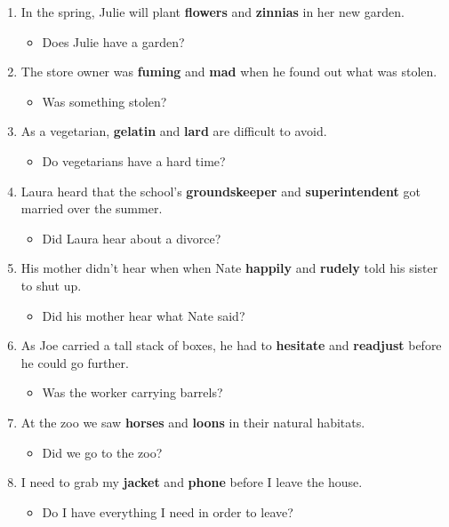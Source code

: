 \documentclass[authoryear]{elsarticle}
\begin{document}
\begin{enumerate}
\item In the spring, Julie will plant \textbf{flowers} and \textbf{zinnias} in her new garden.	\begin{itemize} \item Does Julie have a garden?\end{itemize}
\item The store owner was \textbf{fuming} and \textbf{mad} when he found out what was stolen.	\begin{itemize} \item Was something stolen?\end{itemize}
\item As a vegetarian, \textbf{gelatin} and \textbf{lard} are difficult to avoid.	\begin{itemize} \item Do vegetarians have a hard time?\end{itemize}
\item Laura heard that the school's \textbf{groundskeeper} and \textbf{superintendent} got married over the summer.	\begin{itemize} \item Did Laura hear about a divorce?\end{itemize}
\item His mother didn't hear when when Nate \textbf{happily} and \textbf{rudely} told his sister to shut up.	\begin{itemize} \item Did his mother hear what Nate said?\end{itemize}
\item As Joe carried a tall stack of boxes, he had to \textbf{hesitate} and \textbf{readjust} before he could go further.	\begin{itemize} \item Was the worker carrying barrels?\end{itemize}
\item At the zoo we saw \textbf{horses} and \textbf{loons} in their natural habitats.	\begin{itemize} \item Did we go to the zoo?\end{itemize}
\item I need to grab my \textbf{jacket} and \textbf{phone} before I leave the house.	\begin{itemize} \item Do I have everything I need in order to leave?\end{itemize}

\end{enumerate}
\end{document}
